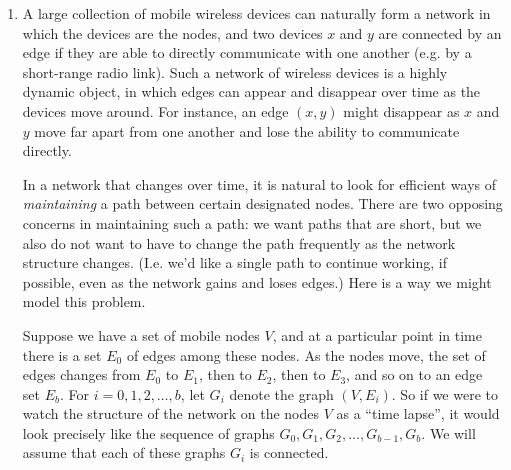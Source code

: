 \documentclass[12pt]{article}
\begin{document}
\begin{enumerate}



\item

A large collection of mobile wireless devices
can naturally form a network
in which the devices are the nodes, and two
devices $x$ and $y$ are connected by an edge
if they are able to directly communicate with
one another (e.g. by a short-range radio link).
Such a network of wireless devices
is a highly dynamic object, in which edges
can appear and disappear over time as the devices move around.
For instance, an edge $(x,y)$ might disappear as $x$ and $y$
move far apart from one another and lose
the ability to communicate directly.

In a network that changes over time, it is natural
to look for efficient ways of {\em maintaining}
a path between certain designated nodes.
There are two opposing concerns in maintaining such a path:
we want paths that are short, but we also do not
want to have to change the path frequently
as the network structure changes.
(I.e. we'd like a single path to continue working, if possible,
even as the network gains and loses edges.)
Here is a way we might model this problem.

Suppose we have a set of mobile nodes $V$,
and at a particular point in time there is a set
$E_0$ of edges among these nodes.
As the nodes move, the set of edges changes
from $E_0$ to $E_1$, then to $E_2$, then to $E_3$,
and so on to an edge set $E_b$.
For $i = 0, 1, 2, \ldots, b$,
let $G_i$ denote the graph $(V,E_i)$.
So if we were to watch the structure of the network
on the nodes $V$ as a ``time lapse'', it would look precisely
like the sequence of graphs $G_0, G_1, G_2, \ldots, G_{b-1}, G_b$.
We will assume that each of these graphs $G_i$ is connected.


\end{enumerate}
\end{document}
